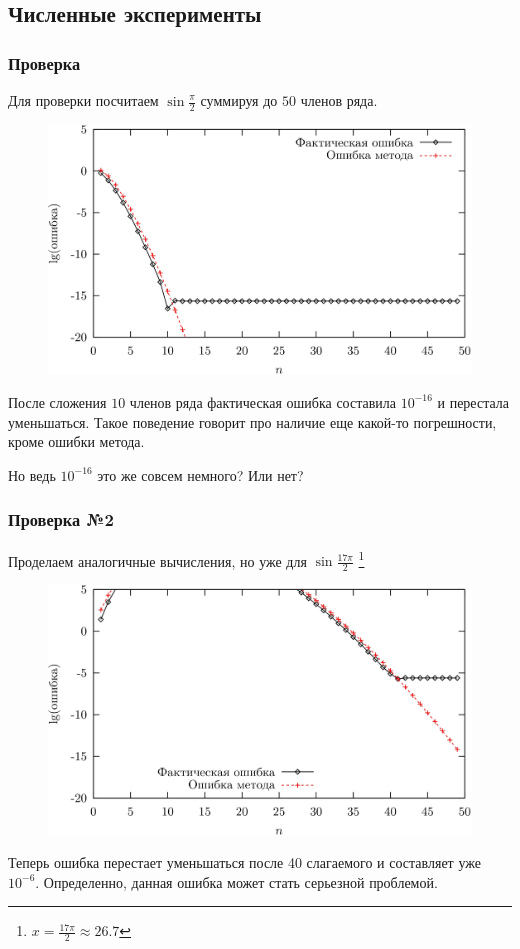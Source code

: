 \documentclass[aspectratio=169,unicode]{beamer}
\begin{document}
\subsection{Численные эксперименты}
\begin{frame}
\frametitle{Проверка}
	Для проверки посчитаем $\sin \frac{\pi}{2}$ суммируя до $50$ членов ряда.

	\begin{figure}%
	\centering
	\includegraphics[height=0.4\textheight]{sine_pi_2.png}
	\end{figure}

	После сложения $10$ членов ряда фактическая ошибка составила $10^{-16}$ и перестала уменьшаться.
	Такое поведение говорит про наличие еще какой-то погрешности, кроме ошибки метода.
	\begin{block}{}
	Но ведь $10^{-16}$ это же совсем немного? Или нет?
	\end{block}
\end{frame}

\begin{frame}
\frametitle{Проверка №2}
	Проделаем аналогичные вычисления, но уже для $\sin \frac{17\pi}{2}$
	\footnote{$x = \frac{17\pi}{2} \approx 26.7$}

	\begin{figure}%
	\centering
	\includegraphics[height=0.4\textheight]{sine_17pi_2.png}
	\end{figure}

	Теперь ошибка перестает уменьшаться после 40 слагаемого и составляет уже $10^{-6}$.
	Определенно, данная ошибка может стать серьезной проблемой.
\end{frame}
\end{document}
